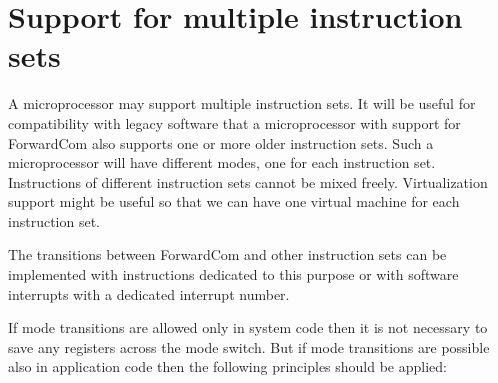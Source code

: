 \documentclass[forwardcom.tex]{subfiles}
\begin{document}
\RaggedRight

\chapter{Support for multiple instruction sets}

A microprocessor may support multiple instruction sets. It will be useful for compatibility with legacy software that a microprocessor with support for ForwardCom also supports one or more older instruction sets. Such a microprocessor will have different modes, one for each instruction set. Instructions of different instruction sets cannot be mixed freely. Virtualization support might be useful so that we can have one virtual machine for each instruction set.
\vspace{2mm}

The transitions between ForwardCom and other instruction sets can be implemented with instructions dedicated to this purpose or with software interrupts with a dedicated interrupt number. 
\vspace{2mm}

If mode transitions are allowed only in system code then it is not necessary to save any registers across the mode switch. But if mode transitions are possible also in application code then the following principles should be applied:
\end{document}

